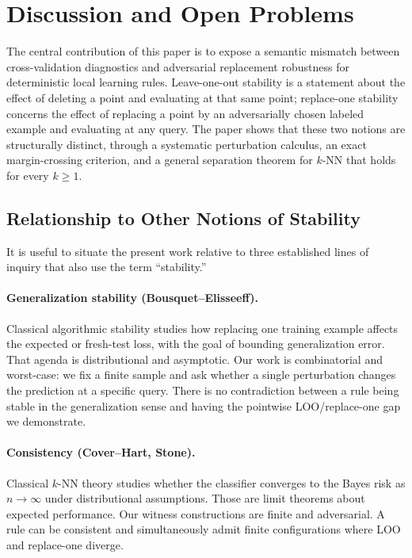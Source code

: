 \section{Discussion and Open Problems}
\label{sec:discussion}

The central contribution of this paper is to expose a semantic mismatch
between cross-validation diagnostics and adversarial replacement robustness
for deterministic local learning rules. Leave-one-out stability is a statement
about the effect of deleting a point and evaluating at that same point;
replace-one stability concerns the effect of replacing a point by an
adversarially chosen labeled example and evaluating at any query. The paper
shows that these two notions are structurally distinct, through a systematic
perturbation calculus, an exact margin-crossing criterion, and a general
separation theorem for $k$-NN that holds for every $k \ge 1$.

\subsection{Relationship to Other Notions of Stability}

It is useful to situate the present work relative to three established lines
of inquiry that also use the term ``stability.''

\paragraph{Generalization stability (Bousquet--Elisseeff).}
Classical algorithmic stability \cite{bousquet2002stability} studies how
replacing one training example affects the expected or fresh-test loss, with
the goal of bounding generalization error. That agenda is distributional and
asymptotic. Our work is combinatorial and worst-case: we fix a finite sample
and ask whether a single perturbation changes the prediction at a specific
query. There is no contradiction between a rule being stable in the
generalization sense and having the pointwise LOO/replace-one gap we
demonstrate.

\paragraph{Consistency (Cover--Hart, Stone).}
Classical $k$-NN theory \cite{cover1967nearest,stone1977consistent} studies
whether the classifier converges to the Bayes risk as $n \to \infty$ under
distributional assumptions. Those are limit theorems about expected
performance. Our witness constructions are finite and adversarial. A rule can
be consistent and simultaneously admit finite configurations where LOO and
replace-one diverge.

